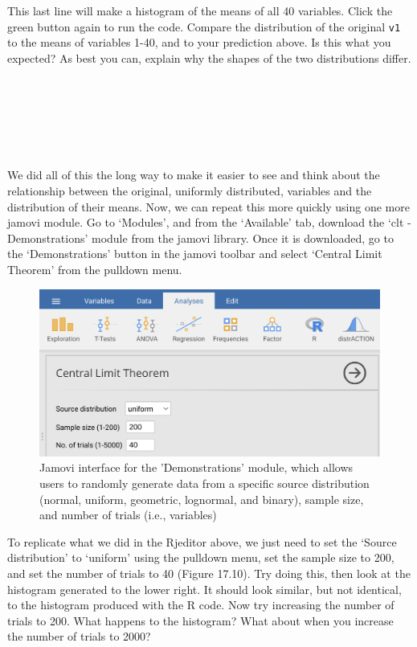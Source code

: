 \documentclass[
]{scrbook}
\begin{document}
This last line will make a histogram of the means of all 40 variables.
Click the green button again to run the code.
Compare the distribution of the original \texttt{v1} to the means of variables 1-40, and to your prediction above.
Is this what you expected?
As best you can, explain why the shapes of the two distributions differ.

\begin{verbatim}






\end{verbatim}

We did all of this the long way to make it easier to see and think about the relationship between the original, uniformly distributed, variables and the distribution of their means.
Now, we can repeat this more quickly using one more jamovi module.
Go to `Modules', and from the `Available' tab, download the `clt - Demonstrations' module from the jamovi library.
Once it is downloaded, go to the `Demonstrations' button in the jamovi toolbar and select `Central Limit Theorem' from the pulldown menu.

\begin{figure}
\includegraphics[width=0.8\linewidth]{img/jamovi_clt} \caption{Jamovi interface for the 'Demonstrations' module, which allows users to randomly generate data from a specific source distribution (normal, uniform, geometric, lognormal, and binary), sample size, and number of trials (i.e., variables)}\label{fig:unnamed-chunk-82}
\end{figure}

To replicate what we did in the Rjeditor above, we just need to set the `Source distribution' to `uniform' using the pulldown menu, set the sample size to 200, and set the number of trials to 40 (Figure 17.10).
Try doing this, then look at the histogram generated to the lower right.
It should look similar, but not identical, to the histogram produced with the R code.
Now try increasing the number of trials to 200.
What happens to the histogram?
What about when you increase the number of trials to 2000?
\end{document}

